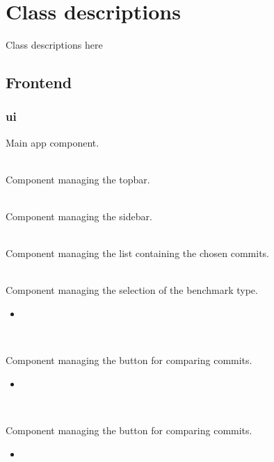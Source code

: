 \section{Class descriptions}

Class descriptions here


\subsection{Frontend}

\subsubsection{ui}

\label{f:1}
{Main app component.}
{\\}
{\\}

\label{f:2}
{Component managing the topbar.}
{\\}
{\\}

\label{f:3}
{Component managing the sidebar.}
{\\}
{\\}

\label{f:4}
{Component managing the list containing the chosen commits.}
{\\}
{\\}

\label{f:5}
{Component managing the selection of the benchmark type.}
{
  \begin{itemize}
      \item {}
  \end{itemize}
}
{\\}

\label{f:6}
{Component managing the button for comparing commits.}
{
  \begin{itemize}
      \item {}
  \end{itemize}
}
{\\}

\label{f:7}
{Component managing the button for comparing commits.}
{
  \begin{itemize}
      \item {}
  \end{itemize}
}
{\\}

